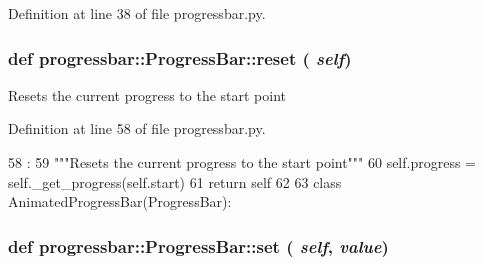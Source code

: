 Definition at line 38 of file progressbar.py.


\hypertarget{classprogressbar_1_1ProgressBar_a1e3174a60591ce40f957310b350d62d4}{
\subsubsection[{reset}]{\setlength{\rightskip}{0pt plus 5cm}def progressbar::ProgressBar::reset ( {\em self})}}
\label{classprogressbar_1_1ProgressBar_a1e3174a60591ce40f957310b350d62d4}
\begin{DoxyVerb}Resets the current progress to the start point\end{DoxyVerb}
 

Definition at line 58 of file progressbar.py.


\begin{DoxyCode}
58                    :
59         """Resets the current progress to the start point"""
60         self.progress = self._get_progress(self.start)
61         return self
62 
63 
class AnimatedProgressBar(ProgressBar):
\end{DoxyCode}
\hypertarget{classprogressbar_1_1ProgressBar_ad47beed6bd8b7239d0e8ce37966c96e6}{
\subsubsection[{set}]{\setlength{\rightskip}{0pt plus 5cm}def progressbar::ProgressBar::set ( {\em self}, \/   {\em value})}}
\label{classprogressbar_1_1ProgressBar_ad47beed6bd8b7239d0e8ce37966c96e6}


